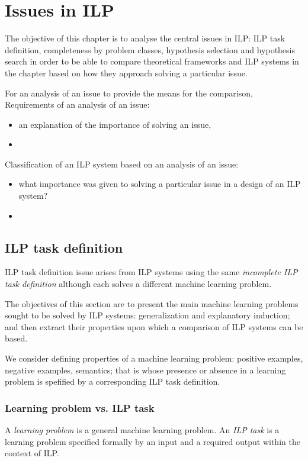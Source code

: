 \chapter{Issues in ILP}\label{chap:issues_in_ilp}
The objective of this chapter is to analyse the central issues in ILP: ILP task definition, completeness by problem classes, hypothesis selection and hypothesis search in order to be able to compare theoretical frameworks and ILP systems in the chapter  based on how they approach solving a particular issue.

For an analysis of an issue to provide the means for the comparison, 
Requirements of an analysis of an issue:
\begin{itemize}
\item an explanation of the importance of solving an issue,
\item 
\end{itemize}

Classification of an ILP system based on an analysis of an issue:
\begin{itemize}
\item what importance was given to solving a particular issue in a design of an ILP system?
\item 
\end{itemize}

\section{ILP task definition}\label{sec:ilp_task_definition}
ILP task definition issue arises from ILP systems using the same \emph{incomplete ILP task definition} although each solves a different machine learning problem.

The objectives of this section are to present the main machine learning problems sought to be solved by ILP systems: generalization and explanatory induction; and then extract their properties upon which a comparison of ILP systems can be based.

We consider defining properties of a machine learning problem: positive examples, negative examples, semantics; that is whose presence or absence in a learning problem is spefified by a corresponding ILP task definition.

\subsection{Learning problem vs. ILP task}
A \emph{learning problem} is a general machine learning problem. An \emph{ILP task} is a learning problem specified formally by an input and a required output within the context of ILP.

